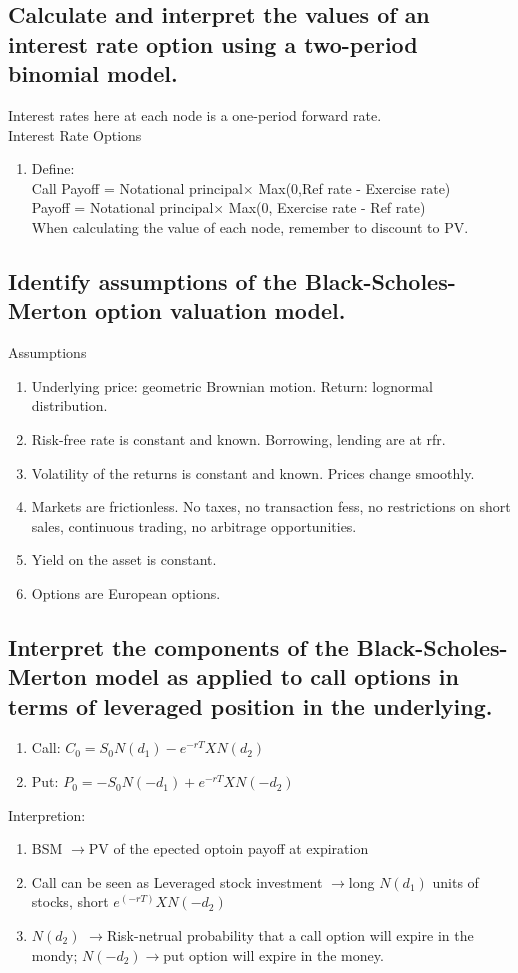\documentclass{article}
\newcommand{\be}{\begin{enumerate}}
\newcommand{\ee}{\end{enumerate}}
\newcommand{\ra}{$\rightarrow$}
\begin{document}
\subsection{Calculate and interpret the values of an interest rate option using a 
two-period binomial model.}
Interest rates here at each node is a one-period forward rate.
\\Interest Rate Options
\be
    \item Define:
        \\ Call Payoff = Notational principal$\times$ Max(0,Ref rate - Exercise rate) 
        \\  Payoff = Notational principal$\times$ Max(0, Exercise rate - Ref rate)
        \\ When calculating the value of each node, remember to discount to PV. 
\ee
\subsection{Identify assumptions of the Black-Scholes-Merton option valuation model.}
Assumptions
\be
    \item Underlying price: geometric Brownian motion. Return: lognormal distribution.
    \item Risk-free rate is constant and known. Borrowing, lending are at rfr.
    \item Volatility of the returns is constant and known. Prices change smoothly.
    \item Markets are frictionless. No taxes, no transaction fess, no restrictions on short
    sales, continuous trading, no arbitrage opportunities.
    \item Yield on the asset is constant.
    \item Options are European options.
\ee
\subsection{Interpret the components of the Black-Scholes-Merton model as applied to
call options in terms of leveraged position in the underlying.}
\be
    \item Call: $C_0=S_0N(d_1)-e^{-rT}XN(d_2)$
    \item Put: $P_0=-S_0N(-d_1)+e^{-rT}XN(-d_2)$ 
\ee
Interpretion:
\be
    \item BSM \ra PV of the epected optoin payoff at expiration
    \item Call can be seen as Leveraged stock investment \ra long $N(d_1)$ units of
    stocks, short $e^(-rT)XN(-d_2)$
    \item $N(d_2)$ \ra Risk-netrual probability that a call option will expire
    in the mondy; $N(-d_2)$\ra put option will expire in the money. 
\ee
\end{document}
